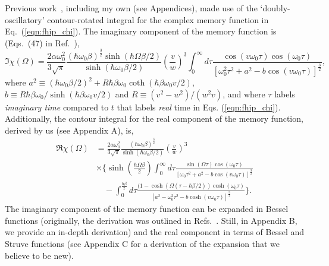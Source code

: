 Previous work~\cite{feynman_mobility_1962, devreese_optical_1972}, including my own (see Appendices), made use of the `doubly-oscillatory' contour-rotated integral for the complex memory function in Eq.~(\ref{eqn:fhip_chi}). The imaginary component of the memory function is (Eqs.~(47) in Ref.~\cite{feynman_mobility_1962}),
\begin{equation}\label{eqn:powerseriesimag}
        \Im{\chi(\Omega)} = \frac{2\alpha \omega_0^2}{3\sqrt{\pi}}
        \frac{(\hbar\omega_0\beta)^{\frac{3}{2}} \sinh(\hbar \Omega \beta
        / 2)}{\sinh(\hbar \omega_0 \beta / 2)} \left(\frac{v}{w}\right)^3
        \int_0^\infty d\tau \frac{\cos(v \omega_0 \tau) \cos(\omega_0
        \tau)}{\left[ \omega_0^2 \tau^2 + a^2 - b \cos(v \omega_0 \tau)
        \right]^{\frac{3}{2}}},
\end{equation}
where $a^2 \equiv\left(\hbar\omega_0\beta/2\right)^2 + R \hbar\beta\omega_0 \coth(\hbar \beta \omega_0 v/2)$, $b \equiv R \hbar\beta\omega_0 / \sinh(\hbar\beta\omega_0 v / 2)$ and $R \equiv (v^2 - w^2) / (w^2 v)$, and where $\tau$ labels \textit{imaginary time} compared to $t$ that labels \textit{real} time in Eqs. (\ref{eqn:fhip_chi}). Additionally, the contour integral for the real component of the memory function, derived by us (see Appendix A), is,
\begin{equation}\label{eqn:powerseriesreal}
    \begin{aligned}
        \Re{\chi(\Omega)} &= \frac{2\alpha\omega_0^2}{3\sqrt{\pi}}
        \frac{(\hbar\omega_0\beta)^{\frac{3}{2}}}{\sinh(\hbar\omega_0\beta/2)}\left(\frac{v}{w}\right)^3\\
        &\times \Biggl\{\sinh\left(\frac{\hbar \Omega
        \beta}{2}\right)\int_0^\infty d\tau \frac{\sin(\Omega \tau)
        \cos(\omega_0 \tau)}{\left[\omega_0\tau^2 + a^2 - b\cos(v \omega_0
        \tau)\right]^{\frac{3}{2}}} \\
        &\quad- \int^{\frac{\hbar\beta}{2}}_0 d\tau
        \frac{(1-\cosh(\Omega(\tau - \hbar\beta/2))
        \cosh(\omega_0\tau)}{\left[a^2 - \omega_0^2 \tau^2
        - b\cosh\left(v\omega_0\tau\right) \right]^{\frac{3}{2}}} \Biggr\}.
    \end{aligned}
\end{equation}
The imaginary component of the memory function can be expanded in Bessel functions (originally, the derivation was outlined in Refs.~\cite{feynman_mobility_1962, devreese_optical_1972}. Still, in Appendix B, we provide an in-depth derivation) and the real component in terms of Bessel and Struve functions (see Appendix C for a derivation of the expansion that we believe to be new).

